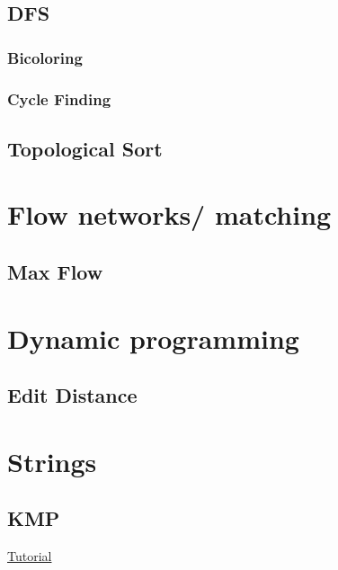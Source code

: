 \documentclass[1pt]{report}
\begin{document}
\section{DFS}
\subsection{Bicoloring}

\subsection{Cycle Finding}

\section{Topological Sort}



\chapter{Flow networks/ matching}
\section{Max Flow}



\chapter{Dynamic programming}
\section{Edit Distance}



\chapter{Strings}
\section{KMP}
\href{https://tanvir002700.wordpress.com/2015/03/03/kmp-knuth-morris-pratt-algorithm/}{Tutorial}

\end{document}
